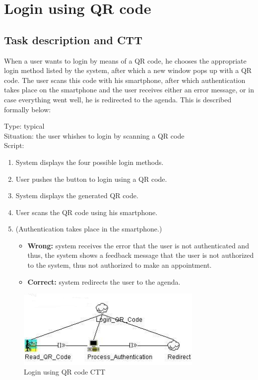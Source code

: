 \documentclass[11pt, a4paper,svglistings]{report}
\begin{document}
\newpage

\section{\label{subsec:loginNFC}Login using QR code}

\subsection{Task description and CTT}

When a user wants to login by means of a QR code, he chooses the appropriate login method listed by the system, after which a new window pops up with a QR code. The user scans this code with his smartphone, after which authentication takes place on the smartphone and the user receives either an error message, or in case everything went well, he is redirected to the agenda. This is described formally below:

Type: typical \\
Situation: the user whishes to login by scanning a QR code \\
Script:
\begin{enumerate}
\item System displays the four possible login methods.
\item User pushes the button to login using a QR code.
\item System displays the generated QR code.
\item User scans the QR code using his smartphone.
\item (Authentication takes place in the smartphone.)
\begin{itemize}
\item \textbf{Wrong:} system receives the error that the user is not authenticated and thus, the system shows a feedback message that the user is not authorized to the system, thus not authorized to make an appointment.
\item \textbf{Correct:} system redirects the user to the agenda.
\end{itemize}
\end{enumerate}

\begin{figure}[H]
\centering
    \includegraphics[width=0.8\textwidth]{LoginQR.png}
  \caption[QR CTT]{\label{fig:Logout}Login using QR code CTT}
\end{figure}
\end{document}
